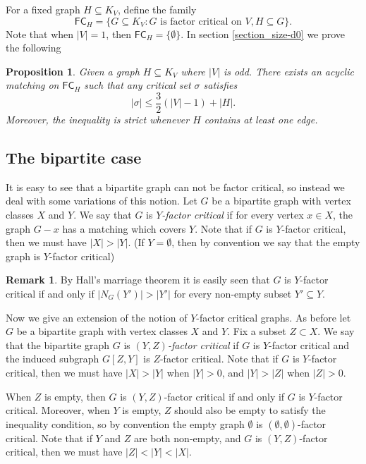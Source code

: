 \documentclass[10pt]{amsart}
\newtheorem{prop}[thm]{Proposition}
\theoremstyle{definition}
\newtheorem{remark}[thm]{Remark}
\begin{document}
	For a fixed graph $H\subseteq K_V$, define the family 
	\[\mathsf{FC}_{H} = \{G\subseteq K_V : G \text{ is factor critical on } V, H\subseteq G\}.\]
	Note that when $|V|=1$, then $\mathsf{FC}_{H} = \{\emptyset\}$.
	In section \ref{section_size-d0} we prove the following
	
	\begin{prop}\label{size-d0} 
		Given a graph $H\subseteq K_V$ where  $|V|$ is odd. There exists an acyclic matching on $\mathsf{FC}_{H}$ such that any critical set $\sigma$ satisfies 
		\[|\sigma|\leq \textstyle{\frac{3}{2}}(|V|-1)+|H|.\]
		Moreover, the inequality is strict whenever $H$ contains at least one edge. 
	\end{prop}
	
	\subsection{The bipartite case} It is easy to see that a bipartite graph can not be factor critical, so instead we deal with some variations of this notion. 
	Let $G$ be a bipartite graph with vertex classes $X$ and $Y$. We say that $G$ is {\em $Y$-factor critical} if for every vertex $x\in X$, the graph $G-x$ has a matching which covers $Y$. Note that if $G$ is $Y$-factor critical, then we must have $|X|>|Y|$. (If $Y=\emptyset$, then by convention we say that the empty graph is $Y$-factor critical)
	\begin{remark} \label{Halls observation}
		By Hall's marriage theorem it is easily seen that $G$ is $Y$-factor critical if and only if $|N_G(Y')|>|Y'|$ for every non-empty subset $Y'\subseteq Y$.
	\end{remark}
	
	Now we give an extension of the notion of $Y$-factor critical graphs. As before let $G$ be a bipartite graph with vertex classes $X$ and $Y$. Fix a subset  
	$Z\subset X$. We say that the bipartite graph $G$ is {\em $(Y,Z)$-factor critical} if $G$ is $Y$-factor critical and the induced subgraph  $G[Z,Y]$ is $Z$-factor critical. Note that if $G$ is $Y$-factor critical, then we must have $|X|>|Y|$ when $|Y|>0$, and $|Y|>|Z|$ when $|Z|>0$. %
	
	When $Z$ is empty, then $G$ is $(Y,Z)$-factor critical if and only if $G$ is $Y$-factor critical. Moreover, when $Y$ is empty, $Z$ should  also be empty to satisfy the inequality condition, so by convention the empty graph $\emptyset$ is $(\emptyset,\emptyset)$-factor critical. Note that if $Y$ and $Z$ are both non-empty, and $G$ is $(Y,Z)$-factor critical, then we must have $|Z|<|Y|<|X|$.
	
\end{document}
